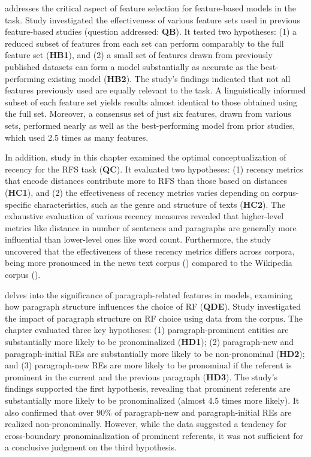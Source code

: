  addresses the critical aspect of feature selection for feature-based models in the \context task. Study \studB investigated the effectiveness of various feature sets used in previous feature-based \context studies (question addressed: \textbf{QB}). It tested two hypotheses: (1) a reduced subset of features from each set can perform comparably to the full feature set (\textbf{HB1}), and (2) a small set of features drawn from previously published datasets can form a model substantially as accurate as the best-performing existing model (\textbf{HB2}). The study's findings indicated that not all features previously used are equally relevant to the task. A linguistically informed subset of each feature set yields results almost identical to those obtained using the full set. Moreover, a consensus set of just six features, drawn from various sets, performed nearly as well as the best-performing model from prior studies, which used 2.5 times as many features.

In addition, study \studC in this chapter examined the optimal conceptualization of recency for the RFS task (\textbf{QC}). It evaluated two hypotheses: (1) recency metrics that encode  distances contribute more to RFS than those based on  distances (\textbf{HC1}), and (2) the effectiveness of recency metrics varies depending on corpus-specific characteristics, such as the genre and structure of texts (\textbf{HC2}). The exhaustive evaluation of various recency measures revealed that higher-level metrics like distance in number of sentences and paragraphs are generally more influential than lower-level ones like word count. Furthermore, the study uncovered that the effectiveness of these recency metrics differs across corpora, being more pronounced in the news text corpus (\wsj) compared to the Wikipedia corpus (\grectwo).
 
  delves into the significance of paragraph-related features in \context models, examining how paragraph structure influences the choice of RF (\textbf{QDE}). Study \studD  investigated the impact of paragraph structure on RF choice using data from the \wsj corpus. The chapter evaluated three key hypotheses: (1) paragraph-prominent entities are substantially more likely to be pronominalized (\textbf{HD1}); (2) paragraph-new and paragraph-initial REs are substantially more likely to be non-pronominal (\textbf{HD2}); and (3) paragraph-new REs are more likely to be pronominal if the referent is prominent in the current and the previous paragraph (\textbf{HD3}). The study's findings supported the first hypothesis, revealing that prominent referents are substantially more likely to be pronominalized (almost 4.5 times more likely). It also confirmed that over 90\% of paragraph-new and paragraph-initial REs are realized non-pronominally. However, while the data suggested a tendency for cross-boundary pronominalization of prominent referents, it was not sufficient for a conclusive judgment on the third hypothesis.

